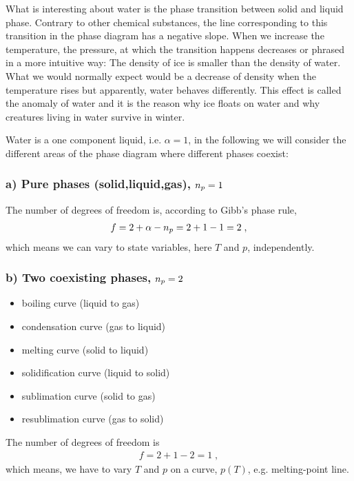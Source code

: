 What is interesting about water is the phase transition between solid and liquid phase. Contrary to other chemical substances, the line corresponding to this transition in the phase diagram has a negative slope. When we increase the temperature, the pressure, at which the transition happens decreases or phrased in a more intuitive way: The density of ice is smaller than the density of water. What we would normally expect would be a decrease of density when the temperature rises but apparently, water behaves differently. This effect is called the anomaly of water and it is the reason why ice floats on water and why  creatures living in water  survive in winter.

Water is a one component liquid, i.e. $\alpha=1$, in the following we will consider the different areas of the phase diagram where different phases coexist:

\subsubsection{a) Pure phases (solid,liquid,gas), $n_{p} =1$}

The number of degrees of freedom is, according to Gibb's phase rule, 
%
\begin{align*}
f = 2 + \alpha -n_{p}  = 2 + 1 - 1 = 2\;,
\end{align*}
%
which means we can vary to state variables, here $T$ and $p$, independently.

\subsubsection{b) Two coexisting phases, $n_{p} =2$}
\begin{itemize}
   \item boiling curve (liquid to gas)
 \item condensation curve (gas to liquid)
	\item melting curve (solid to liquid)
 \item solidification curve (liquid to solid)

\item sublimation curve (solid to gas)
\item resublimation curve (gas to solid)
	
\end{itemize}


The number of degrees of freedom is 
%
\begin{align*}
f = 2 + 1 - 2 = 1\;,
\end{align*}
%
which means, we have to vary  $T$ and $p$ on a curve, $p(T)$, e.g. melting-point line.



